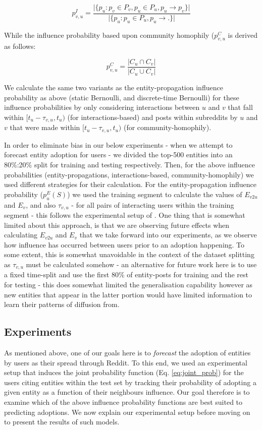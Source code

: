 \documentclass[journal,10pt,draftclsnofoot,onecolumn]{IEEEtran}
\begin{document}
\begin{equation}
p^{I}_{v,u} = \frac{\vert \{ p_u : p_v \in P_v, p_u \in P_u, p_u \rightarrow p_v \} \vert}{\vert \{ p_u : p_u \in P_u, p_u \rightarrow . \} \vert}
\end{equation}

While the influence probability based upon community homophily ($p_{v,u}^C$ is derived as follows:

\begin{equation}
p^C_{v,u} = \frac{\vert C_u \cap C_v \vert}{\vert C_u \cup C_v \vert}
\end{equation}

We calculate the same two variants as the entity-propagation influence probability as above (static Bernoulli, and discrete-time Bernoulli) for these influence probabilities by only considering interactions between $u$ and $v$ that fall within $[t_u - \tau_{v,u}, t_u)$ (for interactions-based) and posts within subreddits by $u$ and $v$ that were made within $[t_u - \tau_{v,u}, t_u)$ (for community-homophily).

In order to eliminate bias in our below experiments - when we attempt to forecast entity adoption for users - we divided the top-500 entities into an 80\%:20\% split for training and testing respectively.
Then, for the above influence probabilities (entity-propagations, interactions-based, community-homophily) we used different strategies for their calculation.
For the entity-propagation influence probability ($p^E_u(S)$) we used the training segment to calculate the values of $E_{v2u}$ and $E_v$, and also $\tau_{v,u}$ - for all pairs of interacting users within the training segment - this follows the experimental setup of \cite{goyal2010learning}.
One thing that is somewhat limited about this approach, is that we are observing future effects when calculating $E_{v2u}$ and $E_v$ that we take forward into our experiments, as we observe how influence has occurred between users prior to an adoption happening.
To some extent, this is somewhat unavoidable in the context of the dataset splitting as $\tau_{v,u}$ must be calculated somehow - an alternative for future work here is to use a fixed time-split and use the first 80\% of entity-posts for training and the rest for testing - this does somewhat limited the generalisation capability however as new entities that appear in the latter portion would have limited information to learn their patterns of diffusion from.

\subsection{Experiments}
As mentioned above, one of our goals here is to \emph{forecast} the adoption of entities by users as their spread through Reddit.
To this end, we used an experimental setup that induces the joint probability function (Eq. \ref{eq:joint_prob}) for the users citing entities within the test set by tracking their probability of adopting a given entity as a function of their neighbours influence.
Our goal therefore is to examine which of the above influence probability functions are best suited to predicting adoptions.
We now explain our experimental setup before moving on to present the results of such models.
\end{document}
